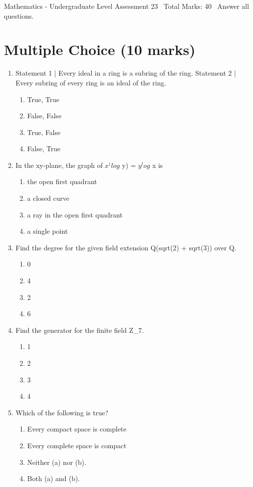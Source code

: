 \documentclass[12pt]{article}
\begin{document}
\begin{center}
Mathematics - Undergraduate Level Assessment 23 \
Total Marks: 40 \
Answer all questions.
\end{center}

\section*{Multiple Choice (10 marks)}
\begin{enumerate}[label=\arabic*.]
\item Statement 1 | Every ideal in a ring is a subring of the ring. Statement 2 | Every subring of every ring is an ideal of the ring.
\begin{enumerate}[label=(\alph*)]
    \item True, True
    \item False, False
    \item True, False
    \item False, True
\end{enumerate}
\item In the xy-plane, the graph of $x^(log$ y) = $y^log$ x is
\begin{enumerate}[label=(\alph*)]
    \item the open first quadrant
    \item a closed curve
    \item a ray in the open first quadrant
    \item a single point
\end{enumerate}
\item Find the degree for the given field extension Q(sqrt(2) + sqrt(3)) over Q.
\begin{enumerate}[label=(\alph*)]
    \item 0
    \item 4
    \item 2
    \item 6
\end{enumerate}
\item Find the generator for the finite field Z\_7.
\begin{enumerate}[label=(\alph*)]
    \item 1
    \item 2
    \item 3
    \item 4
\end{enumerate}
\item Which of the following is true?
\begin{enumerate}[label=(\alph*)]
    \item Every compact space is complete
    \item Every complete space is compact
    \item Neither (a) nor (b).
    \item Both (a) and (b).
\end{enumerate}
\end{enumerate}
\end{document}
